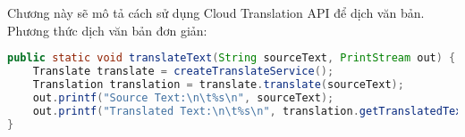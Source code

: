 \documentclass[../thesis.tex]{subfiles}
\begin{document}
Chương này sẽ mô tả cách sử dụng Cloud Translation API để dịch văn bản. Phương thức dịch văn bản đơn giản:
\begin{lstlisting}[language=Java]
public static void translateText(String sourceText, PrintStream out) {
	Translate translate = createTranslateService();
	Translation translation = translate.translate(sourceText);
	out.printf("Source Text:\n\t%s\n", sourceText);
	out.printf("Translated Text:\n\t%s\n", translation.getTranslatedText());
}
\end{lstlisting}
\end{document}
